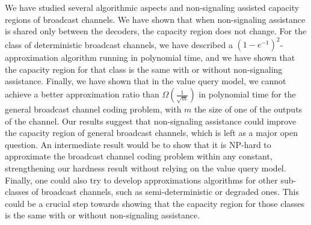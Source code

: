 We have studied several algorithmic aspects and non-signaling assisted capacity regions of broadcast channels. We have shown that when non-signaling assistance is shared only between the decoders, the capacity region does not change. For the class of deterministic broadcast channels, we have described a $(1-e^{-1})^2$-approximation algorithm running in polynomial time, and we have shown that the capacity region for that class is the same with or without non-signaling assistance. Finally, we have shown that in the value query model, we cannot achieve a better approximation ratio than $\Omega\left(\frac{1}{\sqrt{m}}\right)$ in polynomial time for the general broadcast channel coding problem, with $m$ the size of one of the outputs of the channel. Our results suggest that non-signaling assistance could improve the capacity region of general broadcast channels, which is left as a major open question. An intermediate result would be to show that it is \textrm{NP}-hard to approximate the broadcast channel coding problem within any constant, strengthening our hardness result without relying on the value query model. Finally, one could also try to develop approximations algorithms for other sub-classes of broadcast channels, such as semi-deterministic or degraded ones. This could be a crucial step towards showing that the capacity region for those classes is the same with or without non-signaling assistance.
 
